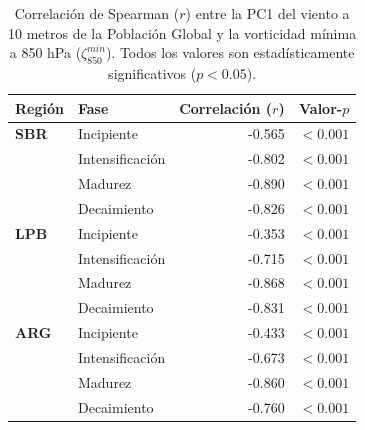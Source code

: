 \begin{table}[htbp]
\centering
\caption[Correlación entre PC1 y vorticidad - Población Global]{Correlación de Spearman ($r$) entre la PC1 del viento a 10 metros de la Población Global y la vorticidad mínima a 850 hPa ($\zeta_{850}^{min}$). Todos los valores son estadísticamente significativos ($p < 0.05$).}
\label{tab:corr_global_w10}
\begin{tabular*}{\textwidth}{@{\extracolsep{\fill}}llrr}
\hline
\textbf{Región} & \textbf{Fase} & \textbf{Correlación ($r$)} & \textbf{Valor-$p$} \\
\hline
\textbf{SBR} & Incipiente & -0.565 & $<0.001$ \\
 & Intensificación & -0.802 & $<0.001$ \\
 & Madurez & -0.890 & $<0.001$ \\
 & Decaimiento & -0.826 & $<0.001$ \\
\hline
\textbf{LPB} & Incipiente & -0.353 & $<0.001$ \\
 & Intensificación & -0.715 & $<0.001$ \\
 & Madurez & -0.868 & $<0.001$ \\
 & Decaimiento & -0.831 & $<0.001$ \\
\hline
\textbf{ARG} & Incipiente & -0.433 & $<0.001$ \\
 & Intensificación & -0.673 & $<0.001$ \\
 & Madurez & -0.860 & $<0.001$ \\
 & Decaimiento & -0.760 & $<0.001$ \\
\hline
\end{tabular*}
\end{table}